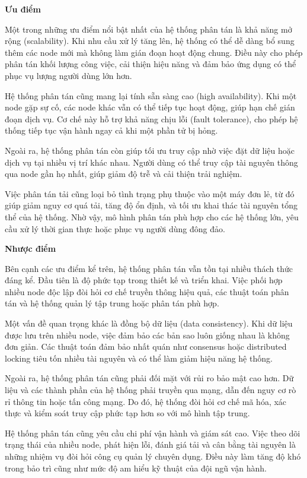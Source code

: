 \textbf{Ưu điểm}

Một trong những ưu điểm nổi bật nhất của hệ thống phân tán là khả năng mở rộng (scalability). Khi nhu cầu xử lý tăng lên, hệ thống có thể dễ dàng bổ sung thêm các node mới mà không làm gián đoạn hoạt động chung. Điều này cho phép phân tán khối lượng công việc, cải thiện hiệu năng và đảm bảo ứng dụng có thể phục vụ lượng người dùng lớn hơn.

Hệ thống phân tán cũng mang lại tính sẵn sàng cao (high availability). Khi một node gặp sự cố, các node khác vẫn có thể tiếp tục hoạt động, giúp hạn chế gián đoạn dịch vụ. Cơ chế này hỗ trợ khả năng chịu lỗi (fault tolerance), cho phép hệ thống tiếp tục vận hành ngay cả khi một phần tử bị hỏng.

Ngoài ra, hệ thống phân tán còn giúp tối ưu truy cập nhờ việc đặt dữ liệu hoặc dịch vụ tại nhiều vị trí khác nhau. Người dùng có thể truy cập tài nguyên thông qua node gần họ nhất, giúp giảm độ trễ và cải thiện trải nghiệm.

Việc phân tán tải cũng loại bỏ tình trạng phụ thuộc vào một máy đơn lẻ, từ đó giúp giảm nguy cơ quá tải, tăng độ ổn định, và tối ưu khai thác tài nguyên tổng thể của hệ thống. Nhờ vậy, mô hình phân tán phù hợp cho các hệ thống lớn, yêu cầu xử lý thời gian thực hoặc phục vụ người dùng đông đảo.

\textbf{Nhược điểm}

Bên cạnh các ưu điểm kể trên, hệ thống phân tán vẫn tồn tại nhiều thách thức đáng kể. Đầu tiên là độ phức tạp trong thiết kế và triển khai. Việc phối hợp nhiều node độc lập đòi hỏi cơ chế truyền thông hiệu quả, các thuật toán phân tán và hệ thống quản lý tập trung hoặc phân tán phù hợp.

Một vấn đề quan trọng khác là đồng bộ dữ liệu (data consistency). Khi dữ liệu được lưu trên nhiều node, việc đảm bảo các bản sao luôn giống nhau là không đơn giản. Các thuật toán đảm bảo nhất quán như consensus hoặc distributed locking tiêu tốn nhiều tài nguyên và có thể làm giảm hiệu năng hệ thống.

Ngoài ra, hệ thống phân tán cũng phải đối mặt với rủi ro bảo mật cao hơn. Dữ liệu và các thành phần của hệ thống phải truyền qua mạng, dẫn đến nguy cơ rò rỉ thông tin hoặc tấn công mạng. Do đó, hệ thống đòi hỏi cơ chế mã hóa, xác thực và kiểm soát truy cập phức tạp hơn so với mô hình tập trung.

Hệ thống phân tán cũng yêu cầu chi phí vận hành và giám sát cao. Việc theo dõi trạng thái của nhiều node, phát hiện lỗi, đánh giá tải và cân bằng tài nguyên là những nhiệm vụ đòi hỏi công cụ quản lý chuyên dụng. Điều này làm tăng độ khó trong bảo trì cũng như mức độ am hiểu kỹ thuật của đội ngũ vận hành.

